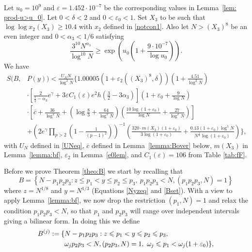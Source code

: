\documentclass[12pt]{amsart}
\begin{document}
\begin{theorem}
\label{theo:B}
Let $u_0=10^9$ and $\varepsilon=1.452\cdot 10^{-7}$ be the corresponding values in Lemma~\ref{lem: prod-u>u_0}. Let $0<\delta<2$ and $0<\varepsilon_0<1$. Set $X_3$ to be such that $\log\log x_2(X_3)\ge 10.4$ with $x_2$ defined in \eqref{notcon1}. Also let $N> (X_3)^8$ be an even integer and $0 < \alpha_3 < 1/6$ satisfying
\begin{equation*}
\frac{3^{10}N^{\alpha_3}}{ \log^{10} N }\ge \exp{\left(u_0\left(1+\frac{9\cdot 10^{-7}}{\log u_0} \right)\right)}.
\end{equation*}
We have
\begin{align*}
S(B,&P(y))< \frac{U_N N}{\log^2N}
 \Bigg\{1.00005(1+\varepsilon_2((X_3)^8,\delta))\left( 1+\frac{4.51}{\log^2N}\right)\\ & \cdot\left[\frac{2}{\frac{1}{2}-\alpha_3} e^{\gamma}+3\varepsilon C_{1}(\varepsilon)e^2h\left(\frac{3}{2}-3\alpha_3\right)\right] 
\left(1+\varepsilon_0+\frac{9}{\log N}\right)\\ & \cdot\left[\overline{c} +\frac{36}{\log^2 N} +\left(\log \frac{8}{3}+\frac{64}{\log^2 N} \right)\left( \frac{10\log (1+\varepsilon_0)}{\log N}+ \frac{27}{\log^2 N}\right)\right] 
 \\ &+\left(2 e^{\gamma}\prod_{p>2}\left( 1-\frac{1}{(p-1)^2}\right) \right)^{-1}\left(\frac{320\cdot m(X_3)(1+\varepsilon_0)}{3\log(1+\varepsilon_0)}+\frac{0.13(1+\varepsilon_0)\log^5 N}{N^{\frac{1}{8}}\log(1+\varepsilon_0)} \right)\Bigg\},
\end{align*}
with $U_N$ defined in \eqref{UNeq}, $\overline{c}$ defined in Lemma~\ref{lemma:Bover} below, $m(X_3)$ in Lemma~\ref{lemma:bf}, $\varepsilon_2$ in Lemma~\ref{e0lem}, and $C_1(\varepsilon)=106$ from Table \ref{tab:fF}.
\end{theorem}
Before we prove Theorem \ref{theo:B} we start by recalling that
\begin{equation*}
B=\left\{ N-p_1p_2p_3:z \le p_1<y \le p_2 \le p_3,~p_1p_2p_3 <N, (p_1p_2p_3,N)=1   \right\}
\end{equation*}
where $z=N^{1/8}$ and $y=N^{1/3}$ (Equations \eqref{Nyzeq} and \eqref{Bset}). With a view to apply Lemma~\ref{lemma:bf}, we now drop the restriction $(p_1,N)=1$ and relax the condition $p_1p_2p_3<N$, so that $p_1$ and $p_2p_3$ will range over independent intervals giving a bilinear form. In doing this we define
\begin{align}
B^{(j)}:=\{& N-p_1p_2p_3: z\le p_1<y\le p_2\le p_3,
 \notag\\ & \omega_jp_2p_3<N,(p_2p_3,N)=1,~\omega_j\le p_1<\omega_j(1+\varepsilon_0)\}, \label{bjdef}
\end{align}
\end{document}
